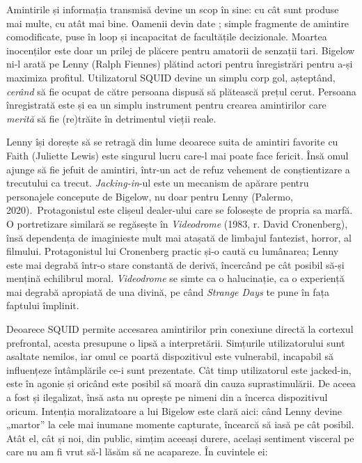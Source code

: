 \documentclass[12pt]{article}
\begin{document}
Amintirile și informația transmisă devine un scop în sine: cu cât sunt produse mai multe, cu atât mai bine. Oamenii devin date \parencite{Vishnevetsky2012a}; simple fragmente de amintire comodificate, puse în loop și incapacitat de facultățile decizionale. Moartea inocenților este doar un prilej de plăcere pentru amatorii de senzații tari. Bigelow ni-l arată pe Lenny (Ralph Fiennes) plătind actori pentru înregistrări pentru a-și maximiza profitul. Utilizatorul SQUID devine un simplu corp gol, așteptând, \textit{cerând} să fie ocupat de către persoana dispusă să plătească prețul cerut. Persoana înregistrată este și ea un simplu instrument pentru crearea amintirilor care \textit{merită} să fie (re)trăite în detrimentul vieții reale.\par

Lenny își dorește să se retragă din lume deoarece suita de amintiri favorite cu Faith (Juliette Lewis) este singurul lucru care-l mai poate face fericit. Însă omul ajunge să fie jefuit de amintiri, într-un act de refuz vehement de conștientizare a trecutului ca trecut. \textit{Jacking-in}-ul este un mecanism de apărare pentru personajele concepute de Bigelow, nu doar pentru Lenny (Palermo, 2020). Protagonistul este clișeul dealer-ului care se folosește de propria sa marfă. O portretizare similară se regăsește în \textit{Videodrome} (1983, r. David Cronenberg), însă \dedouble dependența de imagini\sqtworight este mult mai atașată de limbajul fantezist, horror, al filmului. Protagonistul lui Cronenberg practic și-o caută cu lumânarea; Lenny este mai degrabă într-o stare constantă de derivă, încercând pe cât posibil să-și mențină echilibrul moral. \textit{Videodrome} se simte ca o halucinație, ca o experiență mai degrabă apropiată de una divină, pe când \textit{Strange Days} te pune în fața faptului împlinit.\par

Deoarece SQUID permite accesarea amintirilor prin conexiune directă la cortexul prefrontal, acesta presupune o lipsă a interpretării. Simțurile utilizatorului sunt asaltate nemilos, iar omul ce poartă dispozitivul este vulnerabil, incapabil să influențeze întâmplările ce-i sunt prezentate. Cât timp utilizatorul este jacked-in, este în agonie și oricând este posibil să moară din cauza suprastimulării. De aceea a fost și ilegalizat, însă asta nu oprește pe nimeni din a încerca dispozitivul oricum. Intenția moralizatoare a lui Bigelow este clară aici: când Lenny devine „martor” la cele mai inumane momente capturate, încearcă să iasă pe cât posibil. Atât el, cât și noi, din public, simțim aceeași durere, același sentiment visceral pe care nu am fi vrut să-l lăsăm să ne acapareze. În cuvintele ei:\par
\end{document}
